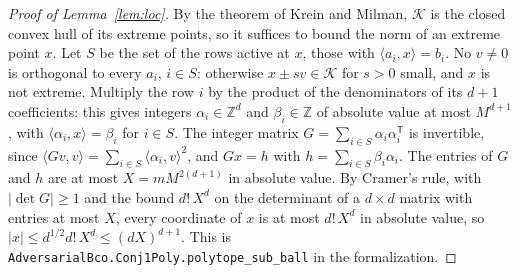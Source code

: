 \documentclass[11pt]{amsart}
\theoremstyle{definition}
\numberwithin{equation}{section}
\newcommand{\cK}{\mathcal{K}}
\newcommand{\ip}[1]{\langle #1\rangle}
\begin{document}
\begin{proof}[Proof of Lemma~\ref{lem:loc}]
By the theorem of Krein and Milman, $\cK$ is the closed convex hull of its extreme points, so it suffices to bound the norm of an extreme point $x$. Let $S$ be the set of the rows active at $x$, those with $\ip{a_i,x}=b_i$. No $v\ne0$ is orthogonal to every $a_i$, $i\in S$: otherwise $x\pm sv\in\cK$ for $s>0$ small, and $x$ is not extreme. Multiply the row $i$ by the product of the denominators of its $d+1$ coefficients: this gives integers $\alpha_i\in\mathbb Z^d$ and $\beta_i\in\mathbb Z$ of absolute value at most $M^{d+1}$, with $\ip{\alpha_i,x}=\beta_i$ for $i\in S$. The integer matrix $G=\sum_{i\in S}\alpha_i\alpha_i^{\mathsf T}$ is invertible, since $\ip{Gv,v}=\sum_{i\in S}\ip{\alpha_i,v}^2$, and $Gx=h$ with $h=\sum_{i\in S}\beta_i\alpha_i$. The entries of $G$ and $h$ are at most $X=mM^{2(d+1)}$ in absolute value. By Cramer's rule, with $|\det G|\ge1$ and the bound $d!\,X^d$ on the determinant of a $d\times d$ matrix with entries at most $X$, every coordinate of $x$ is at most $d!\,X^d$ in absolute value, so $|x|\le d^{1/2}d!\,X^d\le(dX)^{d+1}$.
This is \texttt{AdversarialBco.Conj1Poly.polytope\_sub\_ball} in the formalization.
\end{proof}
\end{document}
